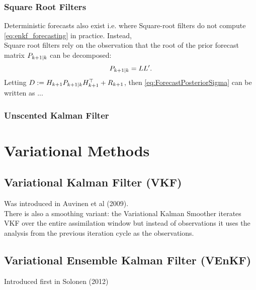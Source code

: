 \subsubsection{Square Root Filters}


Deterministic forecasts also exist i.e. where Square-root filters do not compute
\eqref{eq:enkf_forecasting} in practice. Instead,\\

Square root filters rely on the observation that the root of the prior forecast matrix
$P_{k+1|k}$ can be decomposed:
\[
P_{k+1|k} = L L'.
\]
Letting $D:=H_{k+1}P_{k+1|k} H_{k+1}^\top + R_{k+1}$, then \eqref{eq:ForecastPosteriorSigma} 
can be written as ...

\subsubsection{Unscented Kalman Filter}

\cite{julier1997new}

\section{Variational Methods}


\subsection{Variational Kalman Filter (VKF)} 

Was introduced in Auvinen et al (2009).\\

There is also a smoothing variant: the Variational Kalman Smoother iterates VKF over the entire
assimilation window but instead of observations it uses the
analysis from the previous iteration cycle as the observations.

\subsection{Variational Ensemble Kalman Filter (VEnKF)}

Introduced first in Solonen (2012) 